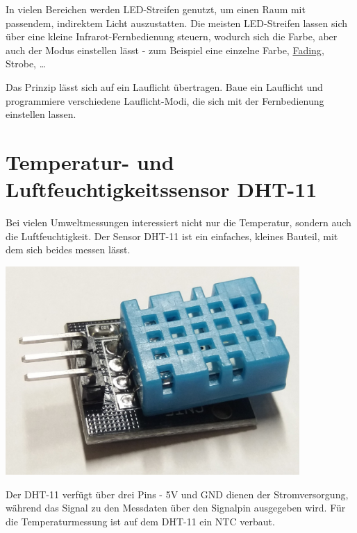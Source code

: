 \begin{projekt}\label{proj:fernsteuerung-lauflicht}
	In vielen Bereichen werden LED-Streifen genutzt, um einen Raum mit passendem, indirektem Licht auszustatten. Die meisten LED-Streifen lassen sich über eine kleine Infrarot-Fernbedienung steuern, wodurch sich die Farbe, aber auch der Modus einstellen lässt - zum Beispiel eine einzelne Farbe, \hyperref[sec:pwm]{Fading}, Strobe, \dots
	
	Das Prinzip lässt sich auf ein Lauflicht übertragen. Baue ein Lauflicht und programmiere verschiedene Lauflicht-Modi, die sich mit der Fernbedienung einstellen lassen.
\end{projekt}


\newpage
\section{Temperatur- und Luftfeuchtigkeitssensor DHT-11}
\label{sec:templuft}

\begin{minipage}{0.7\textwidth}
	Bei vielen Umweltmessungen interessiert nicht nur die Temperatur, sondern auch die Luftfeuchtigkeit. Der Sensor DHT-11 ist ein einfaches, kleines Bauteil, mit dem sich beides messen lässt.
	
\end{minipage}
\hfill
\begin{minipage}{0.25\textwidth}
	\centering
	\includegraphics[width=0.84\textwidth]{./pics/dht11.jpg}
\end{minipage}
\medskip

Der DHT-11 verfügt über drei Pins - 5V und GND dienen der Stromversorgung, während das Signal zu den Messdaten über den Signalpin ausgegeben wird. Für die Temperaturmessung ist auf dem DHT-11 ein NTC verbaut.


